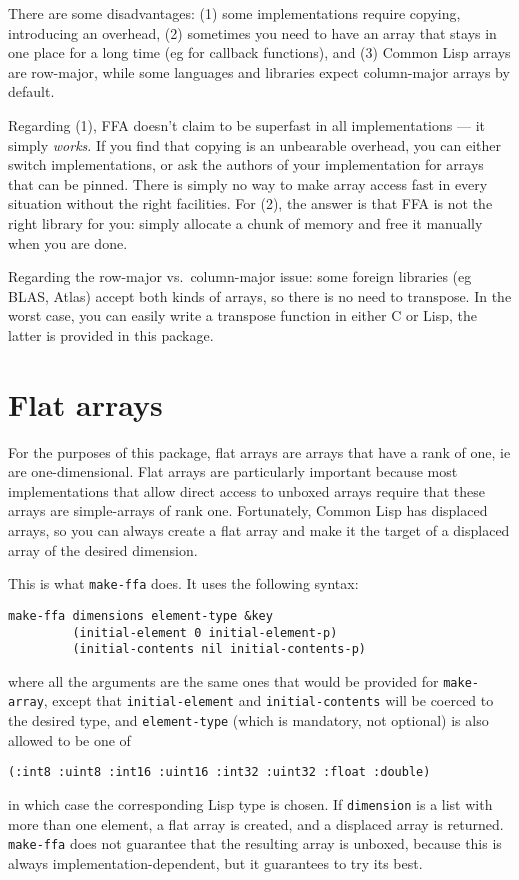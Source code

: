 \documentclass[12pt,a4paper,dvipdfm]{article}
\begin{document}
There are some disadvantages: (1) some implementations require
copying, introducing an overhead, (2) sometimes you need to have an
array that stays in one place for a long time (eg for callback
functions), and (3) Common Lisp arrays are row-major, while some
languages and libraries expect column-major arrays by default.

Regarding (1), FFA doesn't claim to be superfast in all
implementations --- it simply \emph{works}.  If you find that copying
is an unbearable overhead, you can either switch implementations, or
ask the authors of your implementation for arrays that can be pinned.
There is simply no way to make array access fast in every situation
without the right facilities.  For (2), the answer is that FFA is not
the right library for you: simply allocate a chunk of memory and free
it manually when you are done.

Regarding the row-major vs.~column-major issue: some foreign libraries
(eg BLAS, Atlas) accept both kinds of arrays, so there is no need to
transpose.  In the worst case, you can easily write a transpose
function in either C or Lisp, the latter is provided in this package.

\section{Flat arrays}
\label{sec:flat-arrays}

For the purposes of this package, flat arrays are arrays that have a
rank of one, ie are one-dimensional.  Flat arrays are particularly
important because most implementations that allow direct access to
unboxed arrays require that these arrays are simple-arrays of rank
one.  Fortunately, Common Lisp has displaced arrays, so you can always
create a flat array and make it the target of a displaced array of the
desired dimension.

This is what \lstinline!make-ffa! does.  It uses the following syntax:
\begin{lstlisting}
make-ffa dimensions element-type &key
         (initial-element 0 initial-element-p)
         (initial-contents nil initial-contents-p)
\end{lstlisting}
where all the arguments are the same ones that would be provided for
\lstinline!make-array!, except that \lstinline!initial-element! and
\lstinline!initial-contents! will be coerced to the desired type, and
\lstinline!element-type! (which is mandatory, not optional) is also
allowed to be one of
\begin{lstlisting}
(:int8 :uint8 :int16 :uint16 :int32 :uint32 :float :double)
\end{lstlisting}
in which case the corresponding Lisp type is chosen.  If
\lstinline!dimension! is a list with more than one element, a flat
array is created, and a displaced array is returned.
\lstinline!make-ffa! does not guarantee that the resulting array is
unboxed, because this is always implementation-dependent, but it
guarantees to try its best.
\end{document}
